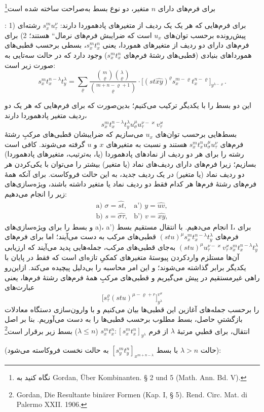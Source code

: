 \documentclass[11pt]{article}
\providecommand{\glqq}{\textquotedblbase}
\providecommand{\grqq}{\textquotedblleft}
\newcommand{\srcLTR}[1]{\relax\ifmmode\text{\mbox{\babelsublr{\foreignlanguage{english}{#1}}}}\else\babelsublr{\foreignlanguage{english}{#1}}\fi}
\newcommand{\srcfn}[2]{\begingroup\renewcommand{\thefootnote}{\srcLTR{#1}}\footnote{#2}\addtocounter{footnote}{-1}\endgroup}
\begin{document}
برای فرم‌های دارای $n$ متغیر، دو نوع بسط به‌صراحت ساخته شده است\srcfn{**)}{نگاه کنید به Gordan, Über Kombinanten. § 2 und 5 (Math. Ann. Bd. V).}:
1) برای فرم‌هایی که هر یک یک ردیف از متغیرهای پادهموردا دارند: $s_x^m u_\tau^\nu$ رشته‌ای پیش‌رونده برحسب توان‌های $u_x$ است که ضرایبش \glqq{}فرم‌های نرمال\grqq{} هستند؛
2) برای فرم‌های دارای دو ردیف از متغیرهای هموردا، یعنی $s_x^m t_x^n$، بسطی برحسب قطبی‌های همورداهای بنیادی (قطبی‌های رشتهٔ فرم‌های $s_x^m t_x^n$) وجود دارد که در حالت سه‌تایی به صورت زیر است:
\[
\tag{I}
s_x^m t_x^{n-\lambda}t_y^\lambda
=\sum_{\varrho}
\frac{\binom{m}{\varrho}\binom{\lambda}{\varrho}}
 {\binom{m+n-\varrho+1}{\varrho}}\cdot
\bigl[(st\widehat{xy})^\varrho s_x^{m-\varrho}t_x^{n-\varrho}\bigr]_{y^{\lambda-\varrho}}.
\]

این دو بسط را با یکدیگر ترکیب می‌کنیم؛ بدین‌صورت که برای فرم‌هایی که هر یک دو ردیف متغیر پادهموردا دارند،
\[
s_x^m t_x^{n-\lambda}t_y^\lambda u_\sigma^\mu u_\tau^{\nu-\varkappa}v_\tau^\varkappa
\]
بسط‌هایی برحسب توان‌های $u_x$ می‌سازیم که ضرایبشان قطبی‌های مرکبِ رشتهٔ فرم‌های $s_x^m t_x^n u_\sigma^\mu u_\tau^\nu$ هستند و نسبت به متغیرهای $x$ و $u$ گرفته می‌شوند.
کافی است رشته را برای هر دو ردیف از نمادهای پادهموردا (یا، به‌ترتیب، متغیرهای پادهموردا) بسازیم؛ زیرا فرم‌های دارای ردیف‌های نماد (یا متغیر) بیشتر را می‌توان با یکی‌کردن هر دو ردیف نماد (یا متغیر) در یک ردیف جدید، به این حالت فروکاست.
برای آنکه همهٔ فرم‌های رشتهٔ فرم‌ها هر کدام فقط دو ردیف نماد یا متغیر داشته باشند، ویژه‌سازی‌های زیر را انجام می‌دهیم:
\[
\begin{array}{ll}
\text{a) } \sigma=\widehat{st}, & \text{a') } y=\widehat{uv},\\[0.3em]
\text{b) } s=\widehat{\sigma\tau}, & \text{b') } v=\widehat{xy},
\end{array}
\]
و بسط را برای ویژه‌سازی‌های a)، a') انجام می‌دهیم.
با انتقال مستقیم بسط I، برای فرم‌های $(stu)^\mu s_x^m t_x^{n-\lambda}t_y^\lambda$ قطبی‌های مرکب به دست می‌آیند؛ اما برای فرم‌های $(stu)^\mu u_\tau^{\nu-\varkappa}v_\tau^\varkappa s_x^m t_x^{n-\lambda}t_y^\lambda$ به‌جای قطبی‌های مرکب، جمله‌هایی پدید می‌آیند که ارزیابی آن‌ها مستلزم واردکردن پیوستهٔ متغیرهای کمکیِ تازه‌ای است که فقط در پایان با یکدیگر برابر گذاشته می‌شوند؛ و این امر محاسبه را بی‌دلیل پیچیده می‌کند.
ازاین‌رو راهی غیرمستقیم در پیش می‌گیریم و قطبی‌های مرکبِ همهٔ فرم‌های رشتهٔ فرم‌ها، یعنی عبارت‌های
\[
\bigl[s_\tau^\varrho(stu)^{\mu-\varrho+r}\bigr]_{y^\lambda}^{v^\varkappa}
\]
را برحسب جمله‌های آغازین این قطبی‌ها بیان می‌کنیم و با وارون‌سازی دستگاه معادلات بازگشتیِ حاصل، بسط مطلوب برحسب قطبی‌ها را به دست می‌آوریم.
بنا بر اصل انتقال، برای قطبیِ مرتبهٔ $\lambda$ از فرم $s_x^m t_x^n:[s_x^m t_x^n]_{y^\lambda}$ ($\lambda\le n$) بسط زیر برقرار است\srcfn{*)}{Gordan, Die Resultante binärer Formen (Kap. I, § 5). Rend. Circ. Mat. di Palermo XXII. 1906.} (حالت $\lambda>n$ با بسط $[s_y^m t_y^n]_{x^{m+n-\lambda}}$ به حالت نخست فروکاسته می‌شود):
\end{document}
